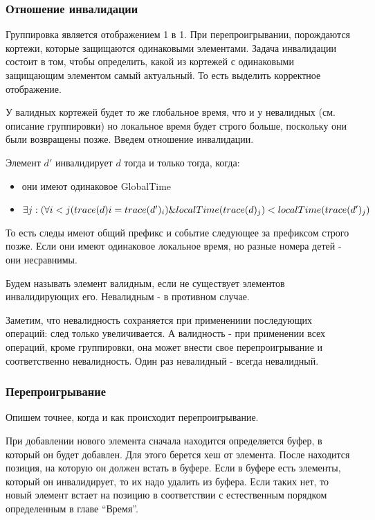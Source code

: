 \documentclass[14pt]{matmex-diploma-custom}
\begin{document}
\subsubsection{Отношение инвалидации}

Группировка является отображением 1 в 1. При перепроигрывании, порождаются кортежи, которые защищаются одинаковыми элементами. Задача инвалидации состоит в том, чтобы определить, какой из кортежей с одинаковыми защищающим элементом самый актуальный. То есть выделить корректное отображение.

У валидных кортежей будет то же глобальное время, что и у невалидных (см. описание группировки) но локальное время будет строго больше, поскольку они были возвращены позже. Введем отношение инвалидации.

Элемент \(d'\) инвалидирует \(d\) тогда и только тогда, когда:

\begin{itemize}
    \item они имеют одинаковое GlobalTime
    \item \(\exists j: (\forall i < j (trace(d)i = trace(d')_i) \\ \& localTime(trace(d)_j) < localTime(trace(d')_j)\)
\end{itemize}

То есть следы имеют общий префикс и событие следующее за префиксом строго позже. Если они имеют одинаковое локальное время, но разные номера детей - они несравнимы.

Будем называть элемент валидным, если не существует элементов инвалидирующих его. Невалидным - в противном случае.

Заметим, что невалидность сохраняется при применениии последующих операций: след только увеличивается. А валидность - при применении всех операций, кроме группировки, она может внести свое перепроигрывание и соответственно невалидность. Один раз невалидный - всегда невалидный.

\subsubsection{Перепроигрывание}

Опишем точнее, когда и как происходит перепроигрывание.

При добавлении нового элемента сначала находится определяется буфер, в который он будет добавлен. Для этого берется хеш от элемента. После находится позиция, на которую он должен встать в буфере. Если в буфере есть элементы, который он инвалидирует, то их надо удалить из буфера. Если таких нет, то новый элемент встает на позицию в соответствии с естественным порядком определенным в главе “Время”.
\end{document}
